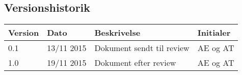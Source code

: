 \subsection{Versionshistorik}
\begin{center}
		\begin{longtable}{ | m{1.5cm} | m{2cm}| m{7.5cm}| m{2cm}| } 
			\hline
			\textbf{Version} & \textbf{Dato} &  \textbf{Beskrivelse} & \textbf{Initialer}  \\ 
			\hline
			0.1  & 13/11 2015 & Dokument sendt til review & AE og AT \\
			\hline
			1.0  & 19/11 2015 & Dokument efter review & AE og AT \\
			\hline
		\end{longtable}	
	\end{center}